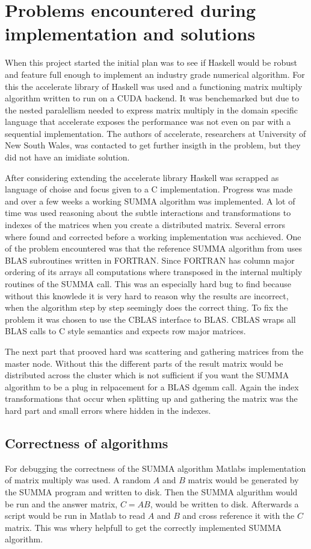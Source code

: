 \documentclass{article}
\begin{document}
\section{Problems encountered during implementation and solutions}
When this project started the initial plan was to see if Haskell\cite{haskell}
would be robust and feature full enough to implement an industry grade
numerical algorithm. For this the accelerate\cite{accelerate}
library of Haskell was used and a functioning matrix multiply algorithm written to run on a CUDA
backend. It was benchemarked but due to the nested paralellism needed to express matrix multiply
in the domain specific language that accelerate exposes the performance was not even on par
with a sequential implementation. The authors of accelerate, researchers at University of New South Wales,
was contacted to get further insigth in the problem, but they did not have an imidiate solution.

After considering extending the accelerate library Haskell was scrapped as language of choise and
focus given to a C implementation. Progress was made and over a few weeks a working SUMMA algorithm
was implemented. A lot of time was used reasoning about the subtle interactions and transformations
to indexes of the matrices when you create a distributed matrix. Several errors where found and
corrected before a working implementation was acchieved. One of the problem encountered was that
the reference SUMMA algorithm from \cite{summa} uses BLAS subroutines written in FORTRAN.
Since FORTRAN has column major ordering
of its arrays all computations where transposed in the internal multiply routines of the SUMMA call.
This was an especially hard bug to find because without this knowlede it is very hard to reason
why the results are incorrect, when the algorithm step by step seemingly does the correct thing.
To fix the problem it was chosen to use the CBLAS interface to BLAS. CBLAS wraps all BLAS calls
to C style semantics and expects row major matrices.

The next part that prooved hard was scattering and gathering matrices from the master node.
Without this the different parts of the result matrix would be distributed across the cluster
which is not sufficient if you want the SUMMA algorithm to be a plug in relpacement for a
BLAS dgemm call. Again the index transformations that occur when splitting up and gathering
the matrix was the hard part and small errors where hidden in the indexes.

\subsection{Correctness of algorithms}
For debugging the correctness of the SUMMA algorithm Matlabs implementation of
matrix multiply was used. A random $A$ and $B$ matrix would be generated by the
SUMMA program and written to disk. Then the SUMMA algurithm would be run and the
answer matrix, $C = A B$, would be written to disk. Afterwards a script would be
run in Matlab to read $A$ and $B$ and cross reference it with the $C$ matrix.
This was whery helpfull to get the correctly implemented SUMMA algorithm.
\end{document}
